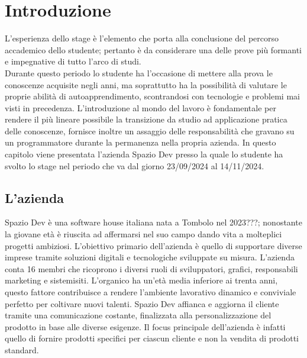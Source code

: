 \chapter{Introduzione}
\label{cap:introduzione}

L'esperienza dello stage è l'elemento che porta alla conclusione del percorso accademico dello studente; pertanto è da considerare una delle prove più formanti e impegnative di tutto l'arco di studi.\\
Durante questo periodo lo studente ha l'occasione di mettere alla prova le conoscenze acquisite negli anni, ma soprattutto ha la possibilità di valutare le proprie abilità di autoapprendimento, scontrandosi con tecnologie e problemi mai visti in precedenza. 
L'introduzione al mondo del lavoro è fondamentale per rendere il più lineare possibile la transizione da studio ad applicazione pratica delle conoscenze, fornisce inoltre un assaggio delle responsabilità che gravano su un programmatore durante la permanenza nella propria azienda.
In questo capitolo viene presentata l'azienda Spazio Dev presso la quale lo studente ha svolto lo stage nel periodo che va dal giorno 23/09/2024 al 14/11/2024.

%
%
%
%

\section{L'azienda}
Spazio Dev è una software house italiana nata a Tombolo nel 2023???; nonostante la giovane età è riuscita ad affermarsi nel suo campo dando vita a molteplici progetti ambiziosi. L'obiettivo primario dell'azienda è quello di supportare diverse imprese tramite soluzioni digitali e tecnologiche sviluppate su misura.
L'azienda conta 16 membri che ricoprono i diversi ruoli di sviluppatori, grafici, responsabili marketing e sistemisiti. L'organico ha un'età media inferiore ai trenta anni, questo fattore contribuisce a rendere l'ambiente lavorativo dinamico e conviviale perfetto per coltivare nuovi talenti.
Spazio Dev affianca e aggiorna il cliente tramite una comunicazione costante, finalizzata alla personalizzazione del prodotto in base alle diverse esigenze. Il focus principale dell'azienda è infatti quello di fornire prodotti specifici per ciascun cliente e non la vendita di prodotti standard.


